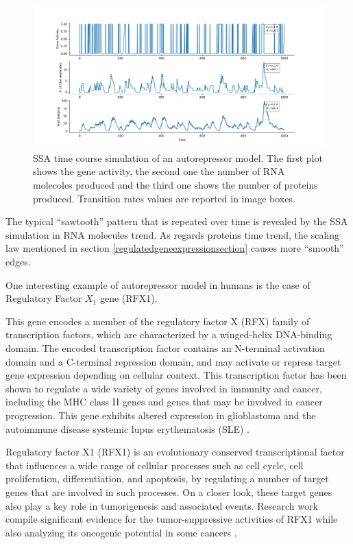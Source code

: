 \documentclass[12pt,a4paper]{report}
\begin{document}
\begin{figure}[!ht]
\hspace*{-2.5cm} 
\includegraphics[scale=0.59]{autorepressortimeplot.png}
\caption{SSA time course simulation of an autorepressor model. The first plot shows the gene activity, the second one the number of RNA molecoles produced and the third one shows the number of proteins produced. Transition rates values are reported in image boxes.}
\label{autorepressortimeplot}
\end{figure}
\newpage
The typical ``sawtooth'' pattern that is repeated over time is revealed by the SSA simulation in RNA molecules trend. As regards proteins time trend, the scaling law mentioned in section \ref{regulatedgeneexpressionsection} causes more ``smooth'' edges. 

One interesting example of autorepressor model in humans is the case of Regulatory Factor $X_{1}$ gene (RFX1).

This gene encodes a member of the regulatory factor X (RFX) family of transcription factors, which are characterized by a winged-helix DNA-binding domain. The encoded transcription factor contains an N-terminal activation domain and a C-terminal repression domain, and may activate or repress target gene expression depending on cellular context. This transcription factor has been shown to regulate a wide variety of genes involved in immunity and cancer, including the MHC class II genes and genes that may be involved in cancer progression. This gene exhibits altered expression in glioblastoma and the autoimmune disease systemic lupus erythematosis (SLE) \cite{RFX1Gene}.

Regulatory factor X1 (RFX1) is an evolutionary conserved transcriptional factor that influences a wide range of cellular processes such as cell cycle, cell proliferation, differentiation, and apoptosis, by regulating a number of target genes that are involved in such processes. On a closer look, these target genes also play a key role in tumorigenesis and associated events. Research work compile significant evidence for the tumor-suppressive activities of RFX1 while also analyzing its oncogenic potential in some cancers \cite{RFX1ArsenalAgainstCancer}.
\end{document}
